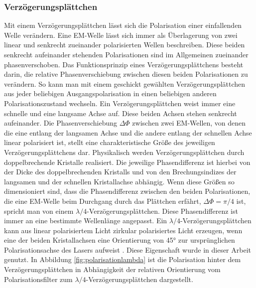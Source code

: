 \documentclass[titlepage,  ngerman]{article}
\begin{document}
	\subsubsection{Verzögerungsplättchen}
	Mit einem Verzögerungsplättchen lässt sich die Polarisation einer einfallenden Welle verändern. Eine EM-Welle lässt sich immer als Überlagerung von zwei linear und senkrecht zueinander polarisierten Wellen beschreiben. Diese beiden senkrecht aufeinander stehenden Polarisationen sind im Allgemeinen zueinander phasenverschoben. Das Funktionsprinzip eines Verzögerungsplättchens besteht darin, die relative Phasenverschiebung zwischen diesen beiden Polarisationen zu verändern. So kann man mit einem geschickt gewählten Verzögerungsplättchen aus jeder beliebigen Ausgangspolarisation in einen beliebigen anderen Polarisationszustand wechseln. Ein Verzögerungsplättchen weist immer eine schnelle und eine langsame Achse auf. Diese beiden Achsen stehen senkrecht aufeinander. Die Phasenverschiebung $\Delta\Phi$ zwischen zwei EM-Wellen, von denen die eine entlang der langsamen Achse und die andere entlang der schnellen Achse linear polarisiert ist, stellt eine charakteristische Größe des jeweiligen Verzögerungsplättchens dar. Physikalisch  werden Verzögerungsplättchen durch doppelbrechende Kristalle realisiert. Die jeweilige Phasendifferenz ist hierbei von der Dicke des doppelbrechenden Kristalls und von den Brechungsindizes der langsamen und der schnellen Kristallachse abhängig. Wenn diese Größen so dimensioniert sind, dass die Phasendifferenz zwischen den beiden Polarisationen, die eine EM-Welle beim Durchgang durch das Plättchen erfährt, $\Delta \Phi = \pi /4 $ ist, spricht man von einem  $\lambda /4$-Verzögerungsplättchen. Diese Phasendifferenz ist immer an eine bestimmte Wellenlänge angepasst.  Ein $\lambda /4$-Verzögerungsplättchen kann aus linear polarisiertem Licht zirkular polarisiertes Licht erzeugen, wenn eine der beiden Kristallachsen eine Orientierung von 45° zur ursprünglichen Polarisationsachse des Lasers aufweist \cite{Hecht.2018}. Diese Eigenschaft wurde in dieser Arbeit genutzt. In Abbildung \ref{fig:polarisationlambda} ist die Polarisation hinter dem Verzögerungsplättchen in Abhängigkeit der relativen Orientierung vom Polarisationsfilter zum $\lambda /4$-Verzögerungsplättchen dargestellt. 
\end{document}
